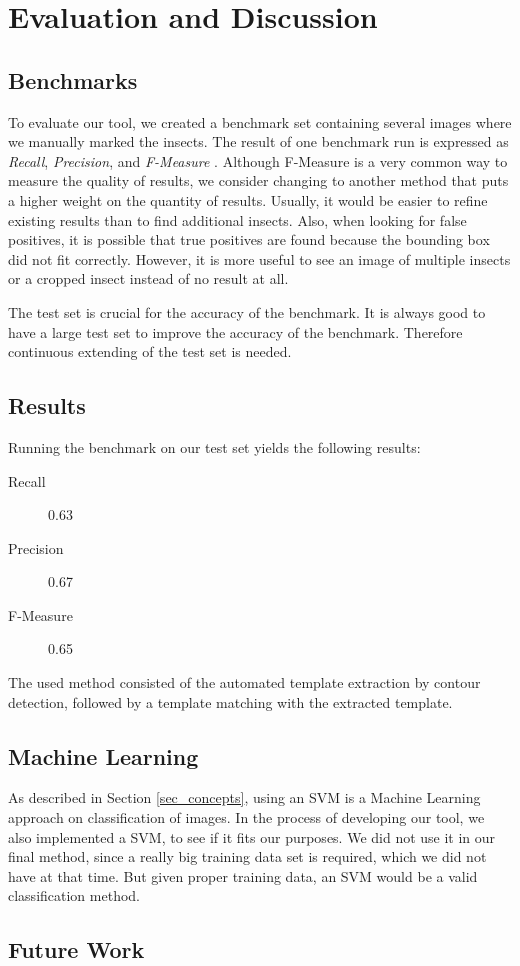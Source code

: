 %
\section{Evaluation and Discussion}
\label{sec_eval}
\label{sec_conclusion}

\subsection{Benchmarks}
To evaluate our tool, we created a benchmark set containing several images where we manually marked the insects.
The result of one benchmark run is expressed as \textit{Recall}, \textit{Precision}, and \textit{F-Measure} \cite{f_measure}.
Although F-Measure is a very common way to measure the quality of results, we consider changing  to another method that puts a higher weight on the quantity of results. 
Usually, it would be easier to refine existing results than to find additional insects. 
Also, when looking for false positives, it is possible that true positives are found because the bounding box did not fit correctly.
However, it is more useful to see an image of multiple insects or a cropped insect instead of no result at all.

The test set is crucial for the accuracy of the benchmark. 
It is always good to have a large test set to improve the accuracy of the benchmark.
Therefore continuous extending of the test set is needed. 

\subsection{Results}

Running the benchmark on our test set yields the following results:
%
\begin{description}
	\item[Recall] 0.63
	\item[Precision] 0.67
	\item[F-Measure] 0.65
\end{description}
%
The used method consisted of the automated template extraction by contour detection, followed by a template matching with the extracted template.

\subsection{Machine Learning}
As described in Section \ref{sec_concepts}, using an SVM is a Machine Learning approach on classification of images.
In the process of developing our tool, we also implemented a SVM, to see if it fits our purposes.
We did not use it in our final method, since a really big training data set is required, which we did not have at that time.
But given proper training data, an SVM would be a valid classification method.

\subsection{Future Work}


